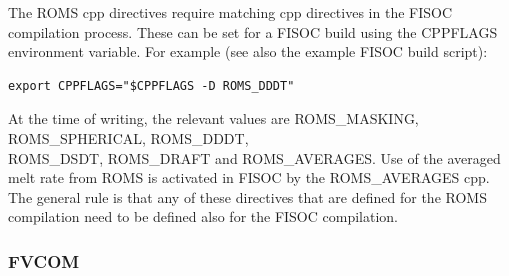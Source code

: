 \documentclass[11pt]{article}
\begin{document}
The ROMS cpp directives require matching cpp directives in the FISOC 
compilation process. 
These can be set for a FISOC build using the CPPFLAGS environment variable.
For example (see also the example FISOC build script):
\begin{lstlisting}
export CPPFLAGS="$CPPFLAGS -D ROMS_DDDT"
\end{lstlisting}
At the time of writing, the relevant values are ROMS\_MASKING, ROMS\_SPHERICAL, 
ROMS\_DDDT, \\
ROMS\_DSDT, ROMS\_DRAFT and ROMS\_AVERAGES. Use of the averaged melt rate from ROMS is activated in FISOC by the ROMS\_AVERAGES cpp. The general rule is that any of these directives that 
are defined for the ROMS compilation need to be defined also for the FISOC 
compilation. 













\subsubsection{FVCOM}
\label{sec:PreReqFVCOM}
\end{document}
